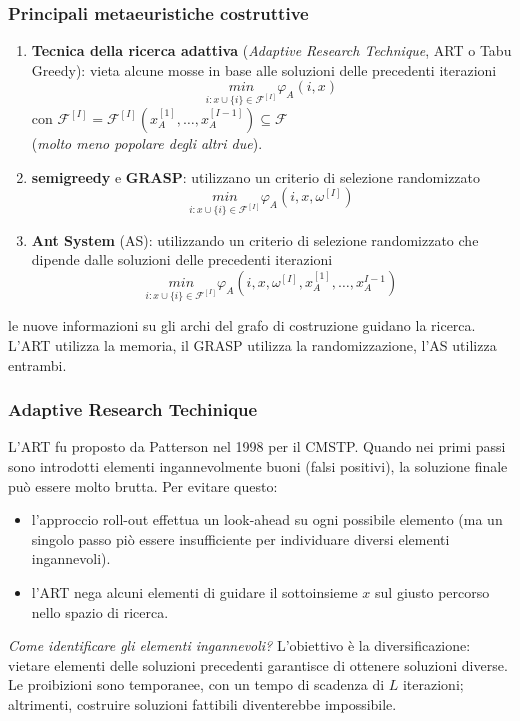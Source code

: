 \documentclass{article}
\begin{document}
\subsubsection{Principali metaeuristiche costruttive}
\begin{enumerate}
    \item \textbf{Tecnica della ricerca adattiva} (\textit{Adaptive Research Technique}, ART o Tabu Greedy):
          vieta alcune mosse in base alle soluzioni delle precedenti iterazioni
          $$\underset{i:x\cup\{i\}\in\mathcal{F}^{[I]}}{min}\varphi_A(i,x)$$
          con $\mathcal{F}^{[I]}=\mathcal{F}^{[I]}\left(x_A^{[1]},\dots, x_A^{[I-1]}\right)\subseteq\mathcal{F}$
          \\(\textit{molto meno popolare degli altri due}).
    \item \textbf{semigreedy} e \textbf{GRASP}: utilizzano un criterio di selezione randomizzato
          $$\underset{i:x\cup\{i\}\in\mathcal{F}^{[I]}}{min}\varphi_A\left(i,x,\omega^{[I]}\right)$$

    \item \textbf{Ant System} (AS): utilizzando un criterio di selezione randomizzato che dipende
          dalle soluzioni delle precedenti iterazioni
          $$\underset{i:x\cup\{i\}\in\mathcal{F}^{[I]}}{min}\varphi_A\left(i,x,\omega^{[I]},x_A^{[1]},\dots,x_A^{I-1}\right)$$

\end{enumerate}
le nuove informazioni su gli archi del grafo di costruzione guidano la ricerca. L'ART utilizza la memoria,
il GRASP utilizza la randomizzazione, l'AS utilizza entrambi.

\subsubsection{Adaptive Research Techinique}
L'ART fu proposto da Patterson nel 1998 per il CMSTP. Quando nei primi passi sono introdotti
elementi ingannevolmente buoni (falsi positivi), la soluzione finale può essere molto brutta.
Per evitare questo:
\begin{itemize}
    \item l'approccio roll-out effettua un look-ahead su ogni possibile elemento
          (ma un singolo passo piò essere insufficiente per individuare diversi elementi ingannevoli).
    \item l'ART nega alcuni elementi di guidare il sottoinsieme $x$ sul giusto percorso nello
          spazio di ricerca.
\end{itemize}
\textit{Come identificare gli elementi ingannevoli?} L'obiettivo è la diversificazione: vietare
elementi delle soluzioni precedenti garantisce di ottenere soluzioni diverse. Le proibizioni
sono temporanee, con un tempo di scadenza di $L$ iterazioni; altrimenti, costruire soluzioni
fattibili diventerebbe impossibile.
\end{document}
